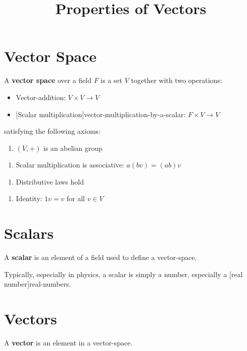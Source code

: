 \documentclass{article}
\title{Properties of Vectors}
\begin{document}
\section{Vector Space}

\begin{definition}
A \textbf{vector space} over a \@{field} $F$ is a \@{set} $V$ together with two operations:

\begin{itemize}
\item \@{Vector-addition}: $V \times V \to V$
\item \@[Scalar multiplication]{vector-multiplication-by-a-scalar}: $F \times V \to V$
\end{itemize}

satisfying the following axioms:

\begin{enumerate}
\item $(V, +)$ is an \@{abelian} \@{group}
\end{enumerate}

\begin{enumerate}
\item Scalar multiplication is associative: $a(bv) = (ab)v$
\end{enumerate}

\begin{enumerate}
\item Distributive laws hold
\end{enumerate}

\begin{enumerate}
\item Identity: $1v = v$ for all $v \in V$
\end{enumerate}
\end{definition}

\section{Scalars}
\begin{definition}[Scalar]
A \textbf{scalar} is an \@{element} of a \@{field} used to define a \@{vector-space}.
\end{definition}

\begin{note}
Typically, especially in physics, a \@{scalar} is simply a number, especially a \@[real number]{real-numbers}.
\end{note}

\section{Vectors}
\begin{definition}[Vector]
A \textbf{vector} is an \@{element} in a \@{vector-space}.
\end{definition}
\end{document}
